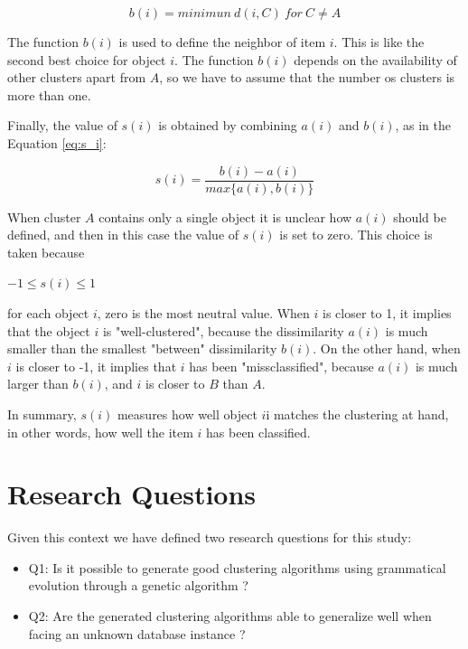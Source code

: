 \documentclass[journal]{IEEEtran}
\begin{document}
\begin{equation} \label{eq:b_i}
b(i) = minimun~d(i, C)~for~C \neq A
\end{equation}

The function $b(i)$ is used to define the neighbor of item $i$. This is like the second best choice for object $i$. The function $b(i)$ depends on the availability of other clusters apart from $A$, so we have to assume that the number os clusters is more than one.

Finally, the value of $s(i)$ is obtained by combining $a(i)$ and $b(i)$, as in the Equation \ref{eq:s_i}:

\begin{equation} \label{eq:s_i}
s(i) = \frac{b(i) - a(i)}{max\{a(i), b(i)\}}
\end{equation}

When cluster $A$ contains only a single object it is unclear how $a(i)$ should be defined, and then in this case the value of $s(i)$ is set to zero. This choice is taken because
\begin{center}
$-1 \le s(i) \le 1$
\end{center}

for each object $i$, zero is the most neutral value. When $i$ is closer to 1, it implies that the object $i$ is "well-clustered", because the dissimilarity $a(i)$ is much smaller than the smallest "between" dissimilarity $b(i)$. On the other hand, when $i$ is closer to -1, it implies that $i$ has been "missclassified", because $a(i)$ is much larger than $b(i)$, and $i$ is closer to $B$ than $A$.

In summary, $s(i)$ measures how well object $i$i matches the clustering at hand, in other words, how well the item $i$ has been classified.

\section{Research Questions} \label{sec:research-questions}

Given this context we have defined two research questions for this study:
\begin{itemize}
	\item Q1: Is it possible to generate good clustering algorithms using grammatical evolution through a genetic algorithm ? 
	\item Q2: Are the generated clustering algorithms able to generalize well when facing an unknown database instance ?
\end{itemize}
\end{document}
